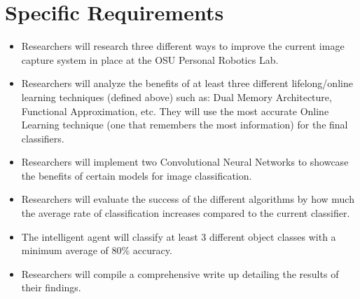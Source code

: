 \documentclass[draftclsnofoot, onecolumn, 10pt, compsoc]{IEEEtran}
\begin{document}
\section{Specific Requirements}
	\begin{itemize}
		\item Researchers will research three different ways to improve the current image capture system in place at the OSU Personal Robotics Lab. 
		
		\item Researchers will analyze the benefits of at least three different lifelong/online learning techniques (defined above) such as: Dual Memory Architecture, Functional Approximation, etc. They will use the most accurate Online Learning technique (one that remembers the most information) for the final classifiers.
	
		\item Researchers will implement two Convolutional Neural Networks to showcase the benefits of certain models for image classification. 
	
		\item Researchers will evaluate the success of the different algorithms by how much the average rate of classification increases compared to the current classifier.
	
		\item The intelligent agent will classify at least 3 different object classes with a minimum average of 80\% accuracy. 
		
		\item Researchers will compile a comprehensive write up detailing the results of their findings. 
	\end{itemize}	
  
\end{document}
